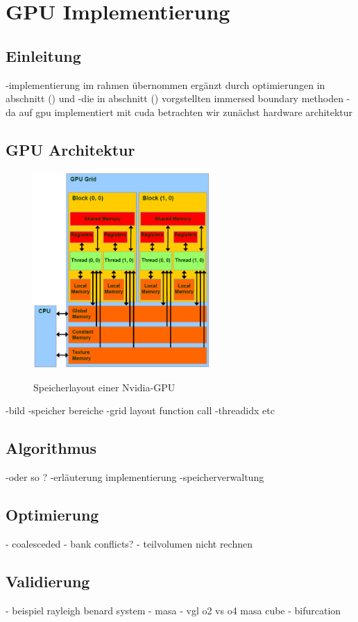 \chapter{GPU Implementierung}
\section{Einleitung}
-implementierung  im rahmen übernommen  ergänzt durch optimierungen in abschnitt () und
-die in abschnitt () vorgstellten immersed boundary methoden
- da auf gpu implementiert mit cuda betrachten wir zunächst hardware architektur


\section{GPU Architektur}

\begin{figure}[!tpb]
  \centering
  \includegraphics[width=0.6\textwidth]{gfx/cuda/cuda.png}\label{fig:gpu_arch}
  \caption{Speicherlayout einer Nvidia-GPU}
\end{figure}

-bild
-speicher bereiche
-grid layout function call
-threadidx etc

\section{Algorithmus}
-oder so ?
-erläuterung  implementierung
-speicherverwaltung

\section{Optimierung}
- coalesceded
- bank conflicts?
- teilvolumen nicht rechnen

\section{Validierung}
- beispiel rayleigh benard system
- masa
- vgl o2 vs o4 masa cube
- bifurcation


\newpage

